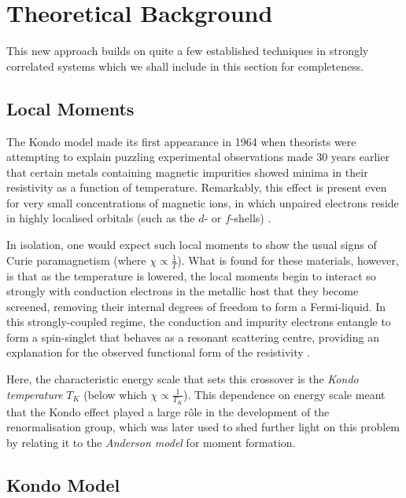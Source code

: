 
\section{Theoretical Background} %
\label{sec:theory}

This new approach builds on quite a few established techniques in strongly correlated systems which we shall include in this section for completeness.

\subsection{Local Moments}

The Kondo model made its first appearance in 1964 when theorists were attempting to explain puzzling experimental observations made 30 years earlier that certain metals containing magnetic impurities showed minima in their resistivity as a function of temperature. Remarkably, this effect is present even for very small concentrations of magnetic ions, in which unpaired electrons reside in highly localised orbitals (such as the $d$- or $f$-shells) \cite{ManyBodyPhysics}.

In isolation, one would expect such local moments to show the usual signs of Curie paramagnetism (where $ \chi \propto \frac{1}{T} $). What is found for these materials, however, is that as the temperature is lowered, the local moments begin to interact so strongly with conduction electrons in the metallic host that they become screened, removing their internal degrees of freedom to form a Fermi-liquid. In this strongly-coupled regime, the conduction and impurity electrons entangle to form a spin-singlet that behaves as a resonant scattering centre, providing an explanation for the observed functional form of the resistivity \cite{Kondo}.

Here, the characteristic energy scale that sets this crossover is the \emph{Kondo temperature} $ T_K $ (below which $ \chi \propto \frac{1}{T_K} $). This dependence on energy scale meant that the Kondo effect played a large r\^{o}le in the development of the renormalisation group, which was later used to shed further light on this problem by relating it to the \emph{Anderson model} for moment formation.

\subsection{Kondo Model}

